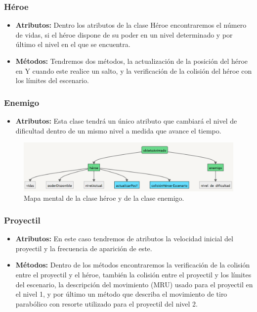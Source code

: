 \documentclass{article}
\begin{document}
    \subsubsection{Héroe}
    \begin{itemize}
        \item \textbf{Atributos:} Dentro los atributos de la clase Héroe encontraremos el número de vidas, si el héroe dispone de su poder en un nivel determinado y por último el nivel en el que se encuentra.
        \item \textbf{Métodos:} Tendremos dos métodos, la actualización de la posición del héroe en Y cuando este realice un salto, y la verificación de la colisión del héroe con los límites del escenario.
    \end{itemize}
    
    \subsubsection{Enemigo}
    \begin{itemize}
        \item \textbf{Atributos:} Esta clase tendrá un único atributo que cambiará el nivel de dificultad dentro de un mismo nivel a medida que avance el tiempo.
    \end{itemize}
    
\begin{figure}[h]
\includegraphics[scale=0.5]{Images/Heroe-enemigo.png}
\centering
\caption{Mapa mental de la clase héroe y de la clase enemigo.}
\label{fig:mmheroe}
\end{figure}
    
    \subsubsection{Proyectil}
    \begin{itemize}
        \item \textbf{Atributos:} En este caso tendremos de atributos la velocidad inicial del  proyectil y la frecuencia de aparición de este.
        \item \textbf{Métodos:} Dentro de los métodos encontraremos la verificación de la colisión entre el proyectil y el héroe, también la colisión entre el proyectil y los límites del escenario, la descripción del movimiento (MRU) usado para el proyectil en el nivel 1, y por último un método que describa el movimiento de tiro parabólico con resorte utilizado para el proyectil del nivel 2.
    \end{itemize}
    
\end{document}
